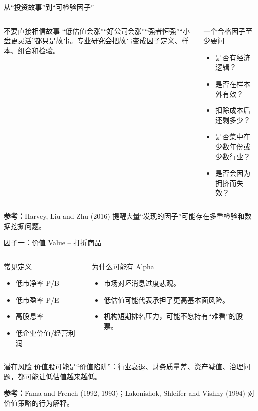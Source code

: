 \documentclass[UTF8,aspectratio=169,11pt]{ctexbeamer}
\newcommand{\source}[1]{\vfill{\scriptsize\color{aqgray}\textbf{参考：}#1}}
\begin{document}
\begin{frame}{从“投资故事”到“可检验因子”}
\begin{columns}[T,totalwidth=\textwidth]
\begin{keybox}{不要直接相信故事}
\small
“低估值会涨”“好公司会涨”“强者恒强”“小盘更灵活”都只是故事。专业研究会把故事变成因子定义、样本、组合和检验。
\end{keybox}
\begin{greenbox}{一个合格因子至少要问}
\small
\begin{itemize}
\item 是否有经济逻辑？
\item 是否在样本外有效？
\item 扣除成本后还剩多少？
\item 是否集中在少数年份或少数行业？
\item 是否会因为拥挤而失效？
\end{itemize}
\end{greenbox}
\end{columns}
\source{Harvey, Liu and Zhu (2016) 提醒大量“发现的因子”可能存在多重检验和数据挖掘问题。}
\end{frame}

\begin{frame}{因子一：价值 Value -- 打折商品}
\begin{columns}[T,totalwidth=\textwidth]
\begin{keybox}{常见定义}
\small
\begin{itemize}
\item 低市净率 P/B
\item 低市盈率 P/E
\item 高股息率
\item 低企业价值/经营利润
\end{itemize}
\end{keybox}
\begin{casebox}{为什么可能有 Alpha}
\small
\begin{itemize}
\item 市场对坏消息过度悲观。
\item 低估值可能代表承担了更高基本面风险。
\item 机构短期排名压力，可能不愿持有“难看”的股票。
\end{itemize}
\end{casebox}
\end{columns}
\vspace{0.25cm}
\begin{riskbox}{潜在风险}
价值股可能是“价值陷阱”：行业衰退、财务质量差、资产减值、治理问题，都可能让低估值越来越低。
\end{riskbox}
\source{Fama and French (1992, 1993)；Lakonishok, Shleifer and Vishny (1994) 对价值策略的行为解释。}
\end{frame}
\end{document}
